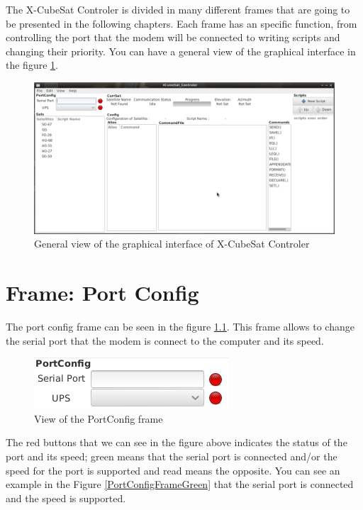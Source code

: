 \documentclass[pdftex,11pt,a4paper,titlepage]{report}
\begin{document}
The X-CubeSat Controler is divided in many different frames that are going to be presented in the following chapters. Each frame has an specific function, from controlling the port that the modem will be connected to writing scripts and changing their priority. You can have a general view of the graphical interface in the figure \ref{GeneralView}.
\begin{figure}[h]
\centering
\includegraphics[scale=0.35]{../images/GeneralView.png}
\caption{General view of the graphical interface of X-CubeSat Controler}
\label{GeneralView}
\end{figure}

\chapter{Frame: Port Config}
\hspace{0.4cm} The port config frame can be seen in the figure \ref{PortConfigFrame}. This frame allows to change the serial port that the modem is connect to the computer and its speed.
\begin{figure}[h]
\centering
\includegraphics[scale=0.9]{../images/PortConfigFrame.png}
\caption{View of the PortConfig frame}
\label{PortConfigFrame}
\end{figure}

The red buttons that we can see in the figure above indicates the status of the port and its speed; green means that the serial port is connected and/or the speed for the port is supported and read means the opposite. You can see an example in the Figure \ref{PortConfigFrameGreen} that the serial port is connected and the speed is supported.
\end{document}
